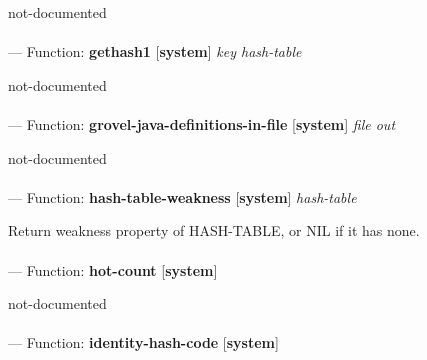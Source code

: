 \begin{adjustwidth}{5em}{5em}
not-documented
\end{adjustwidth}

\paragraph{}
\label{SYSTEM:GETHASH1}
--- Function: \textbf{gethash1} [\textbf{system}] \textit{key hash-table}

\begin{adjustwidth}{5em}{5em}
not-documented
\end{adjustwidth}

\paragraph{}
\label{SYSTEM:GROVEL-JAVA-DEFINITIONS-IN-FILE}
--- Function: \textbf{grovel-java-definitions-in-file} [\textbf{system}] \textit{file out}

\begin{adjustwidth}{5em}{5em}
not-documented
\end{adjustwidth}

\paragraph{}
\label{SYSTEM:HASH-TABLE-WEAKNESS}
--- Function: \textbf{hash-table-weakness} [\textbf{system}] \textit{hash-table}

\begin{adjustwidth}{5em}{5em}
Return weakness property of HASH-TABLE, or NIL if it has none.
\end{adjustwidth}

\paragraph{}
\label{SYSTEM:HOT-COUNT}
--- Function: \textbf{hot-count} [\textbf{system}] \textit{}

\begin{adjustwidth}{5em}{5em}
not-documented
\end{adjustwidth}

\paragraph{}
\label{SYSTEM:IDENTITY-HASH-CODE}
--- Function: \textbf{identity-hash-code} [\textbf{system}] \textit{}

